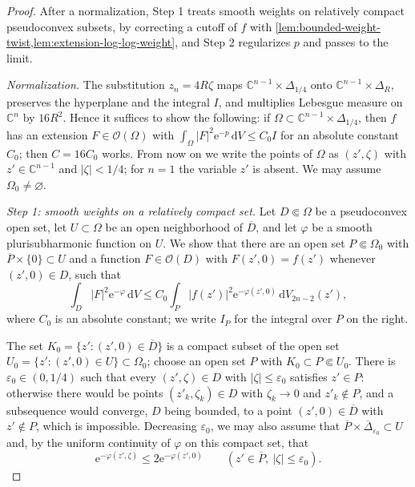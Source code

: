 \begin{proof}
After a normalization, Step 1 treats smooth weights on relatively compact pseudoconvex subsets, by correcting a cutoff of $f$ with \cref{lem:bounded-weight-twist,lem:extension-log-log-weight}, and Step 2 regularizes $p$ and passes to the limit.

\emph{Normalization.} The substitution $z_n=4R\zeta$ maps $\mathbb C^{n-1}\times\Delta_{1/4}$ onto $\mathbb C^{n-1}\times\Delta_R$, preserves the hyperplane and the integral $I$, and multiplies Lebesgue measure on $\mathbb C^n$ by $16R^2$. Hence it suffices to show the following: if $\Omega\subset\mathbb C^{n-1}\times\Delta_{1/4}$, then $f$ has an extension $F\in\mathcal O(\Omega)$ with $\int_\Omega|F|^2\mathrm e^{-p}\,\mathrm dV\le C_0I$ for an absolute constant $C_0$; then $C=16C_0$ works. From now on we write the points of $\Omega$ as $(z',\zeta)$ with $z'\in\mathbb C^{n-1}$ and $|\zeta|<1/4$; for $n=1$ the variable $z'$ is absent. We may assume $\Omega_0\ne\varnothing$.

\emph{Step 1: smooth weights on a relatively compact set.} Let $D\Subset\Omega$ be a pseudoconvex open set, let $U\subset\Omega$ be an open neighborhood of $\overline D$, and let $\varphi$ be a smooth plurisubharmonic function on $U$. We show that there are an open set $P\Subset\Omega_0$ with $\overline P\times\{0\}\subset U$ and a function $F\in\mathcal O(D)$ with $F(z',0)=f(z')$ whenever $(z',0)\in D$, such that
\begin{equation}\label{eq:ot-smooth-step}
 \int_D|F|^2\mathrm e^{-\varphi}\,\mathrm dV\le C_0\int_P|f(z')|^2\mathrm e^{-\varphi(z',0)}\,\mathrm dV_{2n-2}(z'),
\end{equation}
where $C_0$ is an absolute constant; we write $I_P$ for the integral over $P$ on the right.

The set $K_0=\{z':(z',0)\in\overline D\}$ is a compact subset of the open set $U_0=\{z':(z',0)\in U\}\subset\Omega_0$; choose an open set $P$ with $K_0\subset P\Subset U_0$. There is $\varepsilon_0\in(0,1/4)$ such that every $(z',\zeta)\in D$ with $|\zeta|\le\varepsilon_0$ satisfies $z'\in P$: otherwise there would be points $(z'_k,\zeta_k)\in D$ with $\zeta_k\to0$ and $z'_k\notin P$, and a subsequence would converge, $D$ being bounded, to a point $(z',0)\in\overline D$ with $z'\notin P$, which is impossible. Decreasing $\varepsilon_0$, we may also assume that $\overline P\times\overline\Delta_{\varepsilon_0}\subset U$ and, by the uniform continuity of $\varphi$ on this compact set, that
\begin{equation}\label{eq:ot-weight-comparison}
 \mathrm e^{-\varphi(z',\zeta)}\le2\mathrm e^{-\varphi(z',0)}\qquad(z'\in\overline P,\ |\zeta|\le\varepsilon_0).
\end{equation}


\end{proof}
